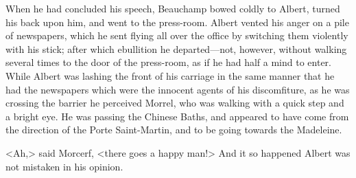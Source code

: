  When he had concluded his speech, Beauchamp bowed coldly to Albert, turned his back upon him, and went to the press-room. Albert vented his anger on a pile of newspapers, which he sent flying all over the office by switching them violently with his stick; after which ebullition he departed—not, however, without walking several times to the door of the press-room, as if he had half a mind to enter.  While Albert was lashing the front of his carriage in the same manner that he had the newspapers which were the innocent agents of his discomfiture, as he was crossing the barrier he perceived Morrel, who was walking with a quick step and a bright eye. He was passing the Chinese Baths, and appeared to have come from the direction of the Porte Saint-Martin, and to be going towards the Madeleine. 

 <Ah,> said Morcerf, <there goes a happy man!> And it so happened Albert was not mistaken in his opinion. 